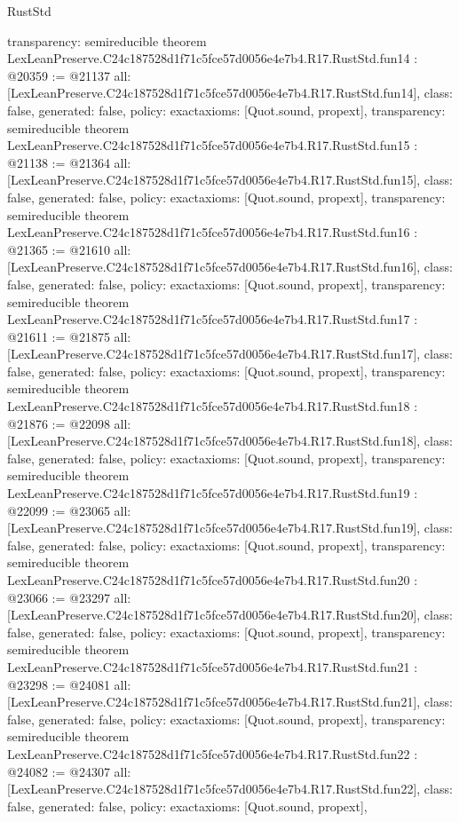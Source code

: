 \begin{lexlean}{RustStd}
\begin{coremodule}
{  transparency: semireducible
}
theorem LexLeanPreserve.C24c187528d1f71c5fce57d0056e4e7b4.R17.RustStd.fun14 : @20359 := @21137 {
  all: [LexLeanPreserve.C24c187528d1f71c5fce57d0056e4e7b4.R17.RustStd.fun14],
  class: false,
  generated: false,
  policy: exact{axioms: [Quot.sound, propext]},
  transparency: semireducible
}
theorem LexLeanPreserve.C24c187528d1f71c5fce57d0056e4e7b4.R17.RustStd.fun15 : @21138 := @21364 {
  all: [LexLeanPreserve.C24c187528d1f71c5fce57d0056e4e7b4.R17.RustStd.fun15],
  class: false,
  generated: false,
  policy: exact{axioms: [Quot.sound, propext]},
  transparency: semireducible
}
theorem LexLeanPreserve.C24c187528d1f71c5fce57d0056e4e7b4.R17.RustStd.fun16 : @21365 := @21610 {
  all: [LexLeanPreserve.C24c187528d1f71c5fce57d0056e4e7b4.R17.RustStd.fun16],
  class: false,
  generated: false,
  policy: exact{axioms: [Quot.sound, propext]},
  transparency: semireducible
}
theorem LexLeanPreserve.C24c187528d1f71c5fce57d0056e4e7b4.R17.RustStd.fun17 : @21611 := @21875 {
  all: [LexLeanPreserve.C24c187528d1f71c5fce57d0056e4e7b4.R17.RustStd.fun17],
  class: false,
  generated: false,
  policy: exact{axioms: [Quot.sound, propext]},
  transparency: semireducible
}
theorem LexLeanPreserve.C24c187528d1f71c5fce57d0056e4e7b4.R17.RustStd.fun18 : @21876 := @22098 {
  all: [LexLeanPreserve.C24c187528d1f71c5fce57d0056e4e7b4.R17.RustStd.fun18],
  class: false,
  generated: false,
  policy: exact{axioms: [Quot.sound, propext]},
  transparency: semireducible
}
theorem LexLeanPreserve.C24c187528d1f71c5fce57d0056e4e7b4.R17.RustStd.fun19 : @22099 := @23065 {
  all: [LexLeanPreserve.C24c187528d1f71c5fce57d0056e4e7b4.R17.RustStd.fun19],
  class: false,
  generated: false,
  policy: exact{axioms: [Quot.sound, propext]},
  transparency: semireducible
}
theorem LexLeanPreserve.C24c187528d1f71c5fce57d0056e4e7b4.R17.RustStd.fun20 : @23066 := @23297 {
  all: [LexLeanPreserve.C24c187528d1f71c5fce57d0056e4e7b4.R17.RustStd.fun20],
  class: false,
  generated: false,
  policy: exact{axioms: [Quot.sound, propext]},
  transparency: semireducible
}
theorem LexLeanPreserve.C24c187528d1f71c5fce57d0056e4e7b4.R17.RustStd.fun21 : @23298 := @24081 {
  all: [LexLeanPreserve.C24c187528d1f71c5fce57d0056e4e7b4.R17.RustStd.fun21],
  class: false,
  generated: false,
  policy: exact{axioms: [Quot.sound, propext]},
  transparency: semireducible
}
theorem LexLeanPreserve.C24c187528d1f71c5fce57d0056e4e7b4.R17.RustStd.fun22 : @24082 := @24307 {
  all: [LexLeanPreserve.C24c187528d1f71c5fce57d0056e4e7b4.R17.RustStd.fun22],
  class: false,
  generated: false,
  policy: exact{axioms: [Quot.sound, propext]},
}
\end{coremodule}
\end{lexlean}
